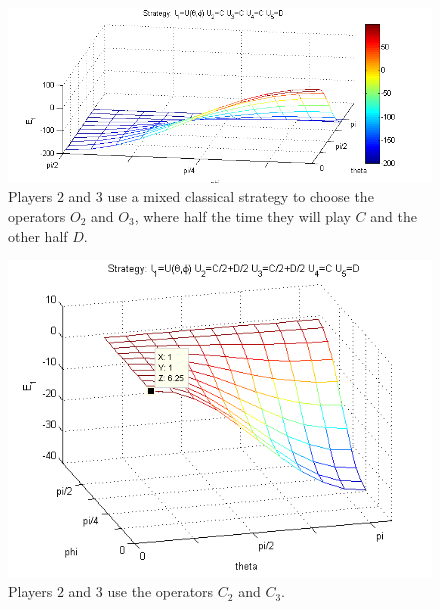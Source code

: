 \begin{table}[h]
\begin{figure}[h]
\centering 
\includegraphics[scale=0.80]{Figures/1.5qubit/meanpirategetscrewed.png}
\caption{Players $2$ and $3$ use a mixed classical strategy to choose the operators $O_{2}$ and $O_{3}$, where half the time they will play $C$ and the other half $D$. }
\label{fig:pg_3players_99_0_1:2}
\end{figure}

\begin{figure}[h]
\centering 
\includegraphics[scale=0.80]{Figures/1.5qubit/mixedclassical.png}
\caption{Players $2$ and $3$ use the operators $C_{2}$ and $C_{3}$. }
\label{fig:pg_3players_99_0_1:2}
\end{figure}


\end{table}
